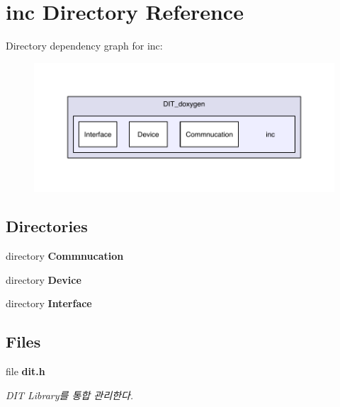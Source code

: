 \section{inc Directory Reference}
\label{dir_d4c0d612476caabcfdb34a959dbd0d3d}
Directory dependency graph for inc\-:
\nopagebreak
\begin{figure}[H]
\begin{center}
\leavevmode
\includegraphics[width=350pt]{dir_d4c0d612476caabcfdb34a959dbd0d3d_dep}
\end{center}
\end{figure}
\subsection*{Directories}
\begin{DoxyCompactItemize}
\item 
directory {\bf Commnucation}
\item 
directory {\bf Device}
\item 
directory {\bf Interface}
\end{DoxyCompactItemize}
\subsection*{Files}
\begin{DoxyCompactItemize}
\item 
file {\bf dit.\-h}
\begin{DoxyCompactList}\small\item\em D\-I\-T Library를 통합 관리한다. \end{DoxyCompactList}\end{DoxyCompactItemize}
